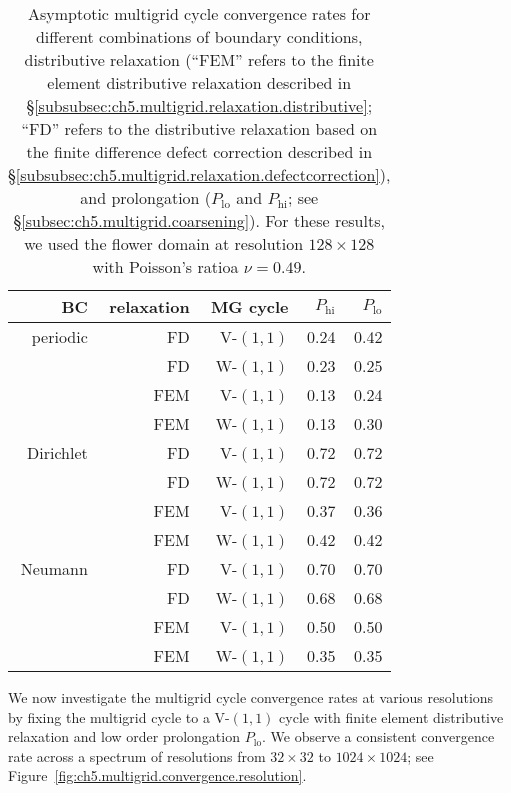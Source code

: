 \begin{table}[htbp]
\begin{center}
\begin{tabular}{*{5}{r}}
\hline
BC & relaxation & MG cycle & $P_{\text{hi}}$ & $P_{\text{lo}}$ \\
\hline\hline
periodic & FD  & V-$(1,1)$ & 0.24 & 0.42 \\
         & FD  & W-$(1,1)$ & 0.23 & 0.25 \\
         & FEM & V-$(1,1)$ & 0.13 & 0.24 \\
         & FEM & W-$(1,1)$ & 0.13 & 0.30 \\
\hline
Dirichlet & FD  & V-$(1,1)$ & 0.72 & 0.72 \\
          & FD  & W-$(1,1)$ & 0.72 & 0.72 \\
          & FEM & V-$(1,1)$ & 0.37 & 0.36 \\
          & FEM & W-$(1,1)$ & 0.42 & 0.42 \\
\hline
Neumann & FD  & V-$(1,1)$ & 0.70 & 0.70 \\
        & FD  & W-$(1,1)$ & 0.68 & 0.68 \\
        & FEM & V-$(1,1)$ & 0.50 & 0.50 \\
        & FEM & W-$(1,1)$ & 0.35 & 0.35 \\
\hline
\end{tabular}
\caption{Asymptotic multigrid cycle convergence rates for different combinations of boundary conditions, distributive relaxation (``FEM'' refers to the finite element distributive relaxation described in \S\ref{subsubsec:ch5.multigrid.relaxation.distributive}; ``FD'' refers to the distributive relaxation based on the finite difference defect correction described in \S\ref{subsubsec:ch5.multigrid.relaxation.defectcorrection}), and prolongation ($P_{\text{lo}}$ and $P_{\text{hi}}$; see \S\ref{subsec:ch5.multigrid.coarsening}). For these results, we used the flower domain at resolution $128 \times 128$ with Poisson's ratioa $\nu = 0.49$.}
\label{tab:ch5.multigrid.convergence}
\end{center}
\end{table}

We now investigate the multigrid cycle convergence rates at various resolutions by fixing the multigrid cycle to a V-$(1,1)$ cycle with finite element distributive relaxation and low order prolongation $P_{\text{lo}}$. We observe a consistent convergence rate across a spectrum of resolutions from $32 \times 32$ to $1024 \times 1024$; see Figure~\ref{fig:ch5.multigrid.convergence.resolution}.


